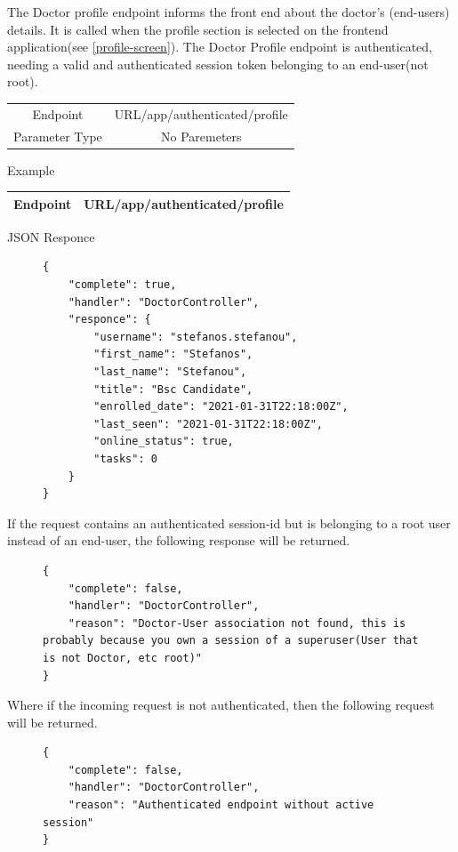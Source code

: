 					The Doctor profile endpoint informs the front end about the doctor's (end-users) details. It is called when the 
					profile section is selected on the frontend application(see \ref{profile-screen}). The Doctor Profile endpoint is authenticated, needing 
					a valid and authenticated session token belonging to an end-user(not root).
					\begin{center}
						\begin{tabular}{ |c|c| } 
							\hline
							Endpoint & {{URL}}/app/authenticated/profile\\
							Parameter Type & No Paremeters  \\
							\hline
						\end{tabular}
					\end{center}
					Example
					\begin{center}
						\begin{tabular}{ |c|c| } 
							\hline
							Endpoint & {{URL}}/app/authenticated/profile\\
							\hline
						\end{tabular}
					\end{center}
					JSON Responce
					\begin{figure}[H]
						\iftrue
						\begin{lstlisting}[]
{
	"complete": true,
	"handler": "DoctorController",
	"responce": {
		"username": "stefanos.stefanou",
		"first_name": "Stefanos",
		"last_name": "Stefanou",
		"title": "Bsc Candidate",
		"enrolled_date": "2021-01-31T22:18:00Z",
		"last_seen": "2021-01-31T22:18:00Z",
		"online_status": true,
		"tasks": 0
	}
}
						\end{lstlisting}
					\end{figure}
					If the request contains an authenticated session-id but is belonging to a root user instead of an end-user, 
					the following response will be returned.
					\begin{figure}[H]
						\iftrue
						\begin{lstlisting}[]
{
	"complete": false,
	"handler": "DoctorController",
	"reason": "Doctor-User association not found, this is probably because you own a session of a superuser(User that is not Doctor, etc root)"
}
						\end{lstlisting}
					\end{figure}
					Where if the incoming request is not authenticated, then the following request will be returned.
					\begin{figure}[H]
						\iftrue
						\begin{lstlisting}[]
{
	"complete": false,
	"handler": "DoctorController",
	"reason": "Authenticated endpoint without active session"
}
						\end{lstlisting}
					\end{figure}
